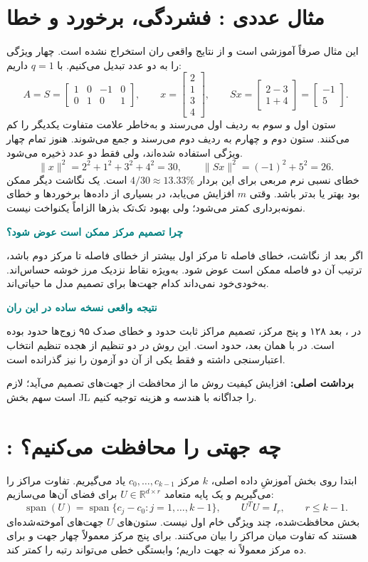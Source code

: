 \documentclass[11pt,a4paper]{article}
\newcommand{\lesson}[1]{\clearpage\section{#1}}
\newcommand{\key}[1]{\par\vspace{4pt}\noindent\colorbox{pale}{\parbox{\dimexpr\textwidth-2\fboxsep\relax}{\textbf{برداشت اصلی:} #1}}\par\vspace{3pt}}
\newcommand{\sub}[1]{\par\vspace{3pt}\textbf{\textcolor{teal}{#1}}\par}
\begin{document}
\lesson{مثال عددی : فشردگی، برخورد و خطا}
این مثال صرفاً آموزشی است و از نتایج واقعی ران استخراج نشده است. چهار ویژگی را به دو عدد تبدیل می‌کنیم. با \(q=1\) داریم:
\[
 A=S=\begin{bmatrix}1&0&-1&0\\0&1&0&1\end{bmatrix},
 \qquad x=\begin{bmatrix}2\\1\\3\\4\end{bmatrix},
 \qquad Sx=\begin{bmatrix}2-3\\1+4\end{bmatrix}
       =\begin{bmatrix}-1\\5\end{bmatrix}.
\]
ستون اول و سوم به ردیف اول می‌رسند و به‌خاطر علامت متفاوت یکدیگر را کم می‌کنند. ستون دوم و چهارم به ردیف دوم می‌رسند و جمع می‌شوند. هنوز تمام چهار ویژگی استفاده شده‌اند، ولی فقط دو عدد ذخیره می‌شود.
\[
 \|x\|^2=2^2+1^2+3^2+4^2=30,
 \qquad \|Sx\|^2=(-1)^2+5^2=26.
\]
خطای نسبی نرم مربعی برای این بردار \(4/30\approx13.33\%\) است. یک نگاشت دیگر ممکن بود بهتر یا بدتر باشد. وقتی \(m\) افزایش می‌یابد، در بسیاری از داده‌ها برخوردها و خطای نمونه‌برداری کمتر می‌شود؛ ولی بهبود تک‌تک بذرها الزاماً یکنواخت نیست.

\sub{چرا تصمیم مرکز ممکن است عوض شود؟}
اگر بعد از نگاشت، خطای فاصله تا مرکز اول بیشتر از خطای فاصله تا مرکز دوم باشد، ترتیب آن دو فاصله ممکن است عوض شود. به‌ویژه نقاط نزدیک مرز خوشه حساس‌اند.  به‌خودی‌خود نمی‌داند کدام جهت‌ها برای تصمیم مدل ما حیاتی‌اند.

\sub{نتیجه واقعی نسخه ساده در این ران}
در ، بعد ۱۲۸ و پنج مرکز،  تصمیم مراکز ثابت حدود  و خطای صدک ۹۵ زوج‌ها حدود  بوده است. در  با همان بعد،  حدود  است. این روش در دو تنظیم از هجده تنظیم انتخاب اعتبارسنجی داشته و فقط یکی از آن دو آزمون را نیز گذرانده است.
\key{افزایش کیفیت روش ما از محافظت از جهت‌های تصمیم می‌آید؛ لازم است سهم بخش JL را جداگانه با هندسه و هزینه توجیه کنیم.}

\lesson{: چه جهتی را محافظت می‌کنیم؟}
ابتدا روی بخش آموزشِ داده اصلی، \(k\) مرکز \(c_0,\ldots,c_{k-1}\) یاد می‌گیریم. تفاوت مراکز را می‌گیریم و یک پایه متعامد \(U\in\mathbb{R}^{d\times r}\) برای فضای آن‌ها می‌سازیم:
\[
 \operatorname{span}(U)=\operatorname{span}\{c_j-c_0:j=1,\ldots,k-1\},
 \qquad U^TU=I_r,\qquad r\leq k-1.
\]
بخش محافظت‌شده، چند ویژگی خام اول نیست. ستون‌های \(U\) جهت‌های آموخته‌شده‌ای هستند که تفاوت میان مراکز را بیان می‌کنند. برای پنج مرکز معمولاً چهار جهت و برای ده مرکز معمولاً نه جهت داریم؛ وابستگی خطی می‌تواند رتبه را کمتر کند.
\end{document}
